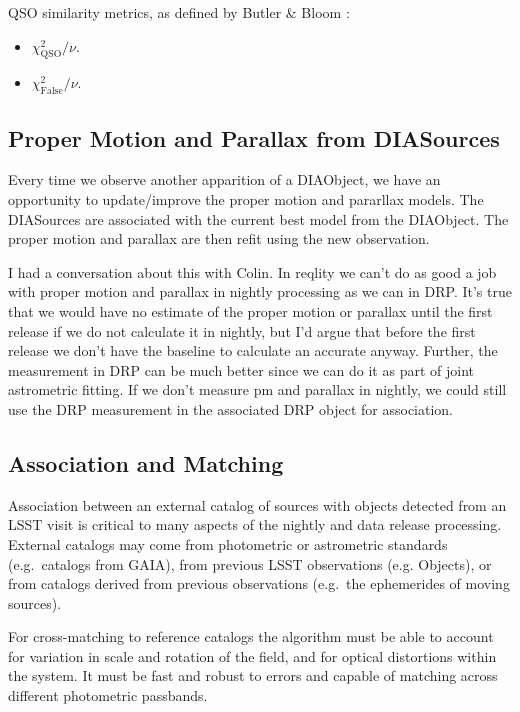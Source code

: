 QSO similarity metrics, as defined by Butler \& Bloom \cite{Butler11}:

\begin{itemize}
\item{$\chi_{\mathrm{QSO}}^2 / \nu$.}
\item{$\chi_{\mathrm{False}}^2 / \nu$.}
\end{itemize}

\subsection{Proper Motion and Parallax from DIASources}
\label{sec:acStellarMotionFitting}
Every time we observe another apparition of a DIAObject, we have an opportunity to update/improve the proper motion and pararllax models.  The DIASources are associated with the current best model from the DIAObject.  The proper motion and parallax are then refit using the new observation.

\begin{note}
I had a conversation about this with Colin.  In reqlity we can't do as good a job with proper motion and parallax in nightly processing as we can in DRP.  It's true that we would have no estimate of the proper motion or parallax until the first release if we do not calculate it in nightly, but I'd argue that before the first release we don't have the baseline to calculate an accurate anyway.  Further, the measurement in DRP can be much better since we can do it as part of joint astrometric fitting.  If we don't measure pm and parallax in nightly, we could still use the DRP measurement in the associated DRP object for association.
\end{note}

\subsection{Association and Matching}
\label{sec:acMatching}

Association between an external catalog of sources with objects
detected from an LSST visit is critical to many aspects of the nightly
and data release processing. External catalogs may come from
photometric or astrometric standards (e.g.\ catalogs from GAIA), from
previous LSST observations (e.g. Objects), or from catalogs derived
from previous observations (e.g.\ the ephemerides of moving
sources). 

For cross-matching to reference catalogs the algorithm must be able to
account for variation in scale and rotation of the field, and for
optical distortions within the system. It must be fast and robust to
errors and capable of matching across different photometric passbands.

